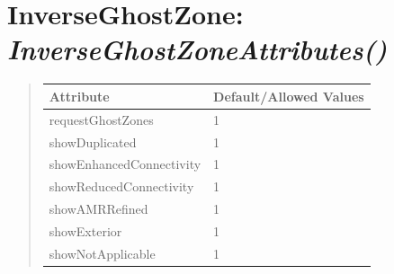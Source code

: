 \documentclass[letterpaper,10pt,english]{sphinxmanual}
\begin{document}
\begin{DUlineblock}{0em}
\item[] 
\end{DUlineblock}

\begin{DUlineblock}{0em}
\item[] 
\end{DUlineblock}


\section{\textbf{InverseGhostZone}: \emph{InverseGhostZoneAttributes()}}
\label{attributes:inverseghostzone-inverseghostzoneattributes}
\begin{DUlineblock}{0em}
\item[] 
\end{DUlineblock}
\begin{quote}

\begin{tabulary}{\linewidth}{|L|L|}
\hline

\textbf{Attribute}
 & 
\textbf{Default/Allowed Values}
\\
\hline
requestGhostZones
 & 
1
\\
\hline
showDuplicated
 & 
1
\\
\hline
showEnhancedConnectivity
 & 
1
\\
\hline
showReducedConnectivity
 & 
1
\\
\hline
showAMRRefined
 & 
1
\\
\hline
showExterior
 & 
1
\\
\hline
showNotApplicable
 & 
1
\\
\hline\end{tabulary}

\end{quote}

\begin{DUlineblock}{0em}
\item[] 
\end{DUlineblock}

\begin{DUlineblock}{0em}
\item[] 
\end{DUlineblock}
\end{document}
